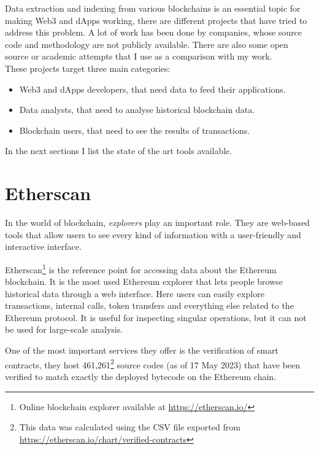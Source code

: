 \label{chapter-3}
Data extraction and indexing from various blockchains is an essential topic for making Web3 and dApps working, there are different projects that have tried to address this problem. A lot of work has been done by companies, whose source code and methodology are not publicly available. There are also some open source or academic attempts that I use as a comparison with my work. \\

\noindent These projects target three main categories:

\begin{itemize}
  \item Web3 and dApps developers, that need data to feed their applications.
  \item Data analysts, that need to analyse historical blockchain data. 
  \item Blockchain users, that need to see the results of transactions.
\end{itemize}

\noindent In the next sections I list the state of the art tools available.

\section{Etherscan}

In the world of blockchain, \textit{explorers} play an important role. They are web-based tools that allow users to see every kind of information with a user-friendly and interactive interface.

Etherscan\footnote{Online blockchain explorer available at \url{https://etherscan.io/}} is the reference point for accessing data about the Ethereum blockchain. It is the most used Ethereum explorer that lets people browse historical data through a web interface. Here users can easily explore transactions, internal calls, token transfers and everything else related to the Ethereum protocol. It is useful for inspecting singular operations, but it can not be used for large-scale analysis.

One of the most important services they offer is the verification of smart contracts, they host 461,261\footnote{This data was calculated using the CSV file exported from \url{https://etherscan.io/chart/verified-contracts}} source codes (as of 17 May 2023) that have been verified to match exactly the deployed bytecode on the Ethereum chain. 

